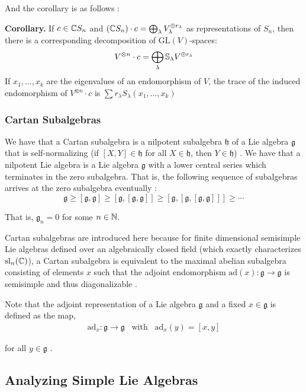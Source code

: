 \documentclass[11pt, a4paper, oneside]{article}
\theoremstyle{plain}
\theoremstyle{definition}
\theoremstyle{example}
\def\GL{\mathrm{GL}} \def\SL{\mathrm{SL}} \def\sl{\mathrm{sl}} \def\gl{\mathrm{gl}} \def\SO{\mathrm{SO}} \def\SU{\mathrm{SU}}  \def\SP{\mathrm{SP}} \def\g{\mathfrak{g}} \def\h{\mathfrak{h}} \def\Sym{\mathrm{Sym}}
\def\ad{\mathrm{ad}}
\begin{document}
And the corollary is as follows \cite[\S 6.1, Corollary 6.6]{fulton}:

\par
\textbf{Corollary.} If $c \in \mathbb{C} S_n$ and $(\mathbb{C} S_n) \cdot c = \bigoplus_{\lambda} V_{\lambda}^{\oplus r_{\lambda}}$ as representations of $S_n$, then there is a corresponding decomposition of $\GL(V)$-spaces: $$V^{\otimes n} \cdot c = \bigoplus_{\lambda} \mathbb{S}_{\lambda} V^{\oplus r_{\lambda}}$$ If $x_1, \ldots, x_k$ are the eigenvalues of an endomorphism of $V$, the trace of the induced endomorphism of $V^{\otimes n} \cdot c$ is $\sum r_{\lambda} S_{\lambda}(x_1, \ldots, x_k)$

\subsubsection{Cartan Subalgebras}

We have that a Cartan subalgebra is a nilpotent subalgebra $\mathfrak{h}$ of a Lie algebra $\mathfrak{g}$ that is self-normalizing (if $[X, Y] \in \mathfrak{h}$ for all $X \in \mathfrak{h}$, then $Y \in \mathfrak{h}$) \cite{cartanwiki}. We have that a nilpotent Lie algebra is a Lie algebra $\mathfrak{g}$ with a lower central series which terminates in the zero subalgebra. That is, the following sequence of subalgebras arrives at the zero subalgebra eventually \cite{nilpotentwiki}: $$\g \geq [\g, \g] \geq [\g, [\g, \g]] \geq [\g, [\g, [\g, \g]]] \geq \cdots$$

That is, $\g_n = 0$ for some $n \in \mathbb{N}$.

\par
Cartan subalgebras are introduced here because for finite dimensional semisimple Lie algebras defined over an algebraically closed field (which exactly characterizes $\sl_n(\CC)$), a Cartan subalgebra is equivalent to the maximal abelian subalgebra consisting of elements $x$ such that the adjoint endomorphism $\ad(x): \g \to \g$ is semisimple and thus diagonalizable \cite{cartanwiki}.

\par
Note that the adjoint representation of a Lie algebra $\g$ and a fixed $x \in \g$ is defined as the map,
\begin{align*}
\ad_x: \g \to \g \; \; \; \text{with} \; \; \; \ad_x(y) = [x, y]
\end{align*}

for all $y \in \g$ \cite{adjointwiki}.

\subsection{Analyzing Simple Lie Algebras}
\end{document}
